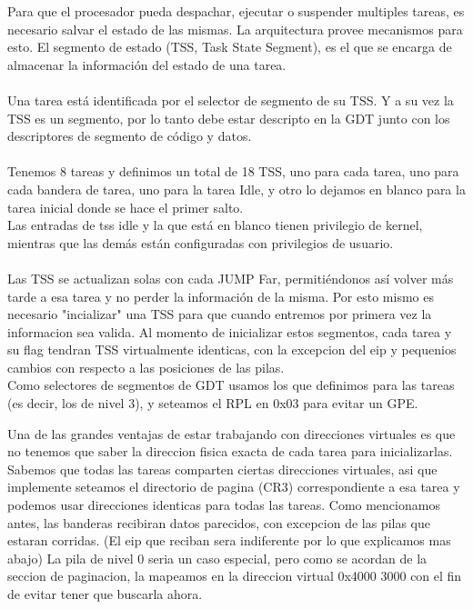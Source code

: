Para que el procesador pueda despachar, ejecutar o suspender multiples tareas, es necesario salvar el estado de las mismas. La arquitectura provee mecanismos para esto. El segmento de estado (TSS, Task State Segment), es el que se encarga de almacenar la informaci\'on del estado de una tarea.\\
\\
Una tarea est\'a identificada por el selector de segmento de su TSS. Y a su vez la TSS es un segmento, por lo tanto debe estar descripto en la GDT junto con los descriptores de segmento de c\'odigo y datos.\\
\\
Tenemos 8 tareas y definimos un total de 18 TSS, uno para cada tarea, uno para cada bandera de tarea, uno para la tarea Idle, y otro lo dejamos en blanco para la tarea inicial donde se hace el primer salto.\\
Las entradas de tss idle y la que est\'a en blanco tienen privilegio de kernel, mientras que las dem\'as est\'an configuradas con privilegios de usuario.\\
\\
Las TSS se actualizan solas con cada JUMP Far, permiti\'endonos as\'i volver m\'as tarde a esa tarea y no perder la informaci\'on de la misma. Por esto mismo es necesario "incializar" una TSS para que cuando entremos por primera vez la informacion
sea valida. Al momento de inicializar estos segmentos, cada tarea y su flag tendran TSS virtualmente identicas, con la excepcion del eip y pequenios cambios con respecto a las posiciones de las pilas.\\

Como selectores de segmentos de GDT usamos los que definimos para las tareas (es decir, los de nivel 3), y seteamos el RPL en 0x03 para evitar un GPE. 

Una de las grandes ventajas de estar trabajando con direcciones virtuales es que no tenemos que saber la direccion fisica exacta de cada tarea para inicializarlas. 
Sabemos que todas las tareas comparten ciertas direcciones virtuales, asi que implemente seteamos el directorio de pagina (CR3) correspondiente a esa tarea y podemos usar direcciones identicas para todas las tareas.
Como mencionamos antes, las banderas recibiran datos parecidos, con excepcion de las pilas que estaran corridas. (El eip que reciban sera indiferente por lo que explicamos mas abajo)
La pila de nivel 0 seria un caso especial, pero como se acordan de la seccion de paginacion, la mapeamos en la direccion virtual 0x4000 3000 con el fin de evitar tener que buscarla ahora.

